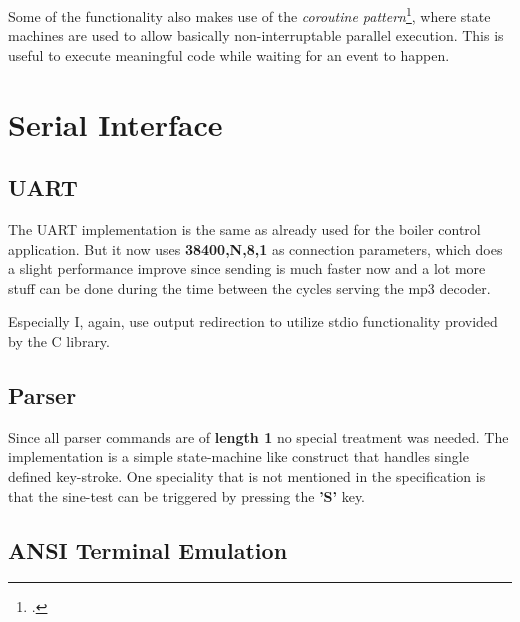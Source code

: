 \documentclass[12pt,a4paper,titlepage,oneside]{article}
\begin{document}
Some of the functionality also makes use of the {\it coroutine pattern}\footcite{Knuth}, where state machines are used to allow basically non-interruptable parallel execution. This is useful to execute meaningful code while waiting for an event to happen.

\section{Serial Interface}

\subsection{UART}

The UART implementation is the same as already used for the boiler control application. But it now uses {\bf 38400,N,8,1} as connection parameters, which does a slight performance improve since sending is much faster now and a lot more stuff can be done during the time between the cycles serving the mp3 decoder.

Especially I, again, use output redirection to utilize stdio functionality provided by the C library.

\subsection{Parser}

Since all parser commands are of {\bf length 1} no special treatment was needed. The implementation is a simple state-machine like construct that handles single defined key-stroke. One speciality that is not mentioned in the specification is that the sine-test can be triggered by pressing the {\bf 'S'} key.

\subsection{ANSI Terminal Emulation}
\end{document}
